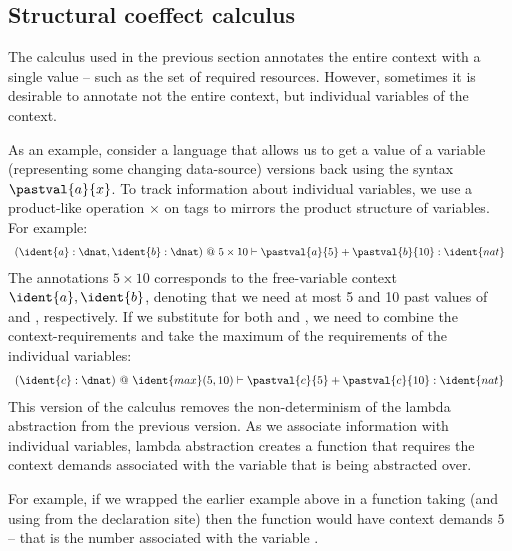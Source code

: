
\subsection{Structural coeffect calculus}

The calculus used in the previous section annotates the entire context with a single value --  such
as the set of required resources. However, sometimes it is desirable to annotate not the entire 
context, but individual variables of the context.

As an example, consider a language that allows us to get a value of a variable (representing
some changing data-source)  versions back using the syntax $\pastval{a}{x}$. 
To track information about individual variables, we use a product-like operation $\times$ on tags 
to mirrors the product structure of variables. For example:
%
\begin{equation*}
\begin{array}{l}
(\ident{a}:\dnat, \ident{b}:\dnat) ~@~ 5 \times 10
  \vdash
    \pastval{a}{5}+\pastval{b}{10}: \ident{nat}
\end{array}
\end{equation*}
%
The annotations $5 \times 10$ corresponds to the free-variable context $\ident{a}, \ident{b}$, denoting
that we need at most 5 and 10 past values of  and , respectively. If we substitute 
 for both  and , we need to combine the context-requirements and take the
maximum of the requirements of the individual variables:
%
\begin{equation*}
\begin{array}{l}
(\ident{c}:\dnat) ~@~ \ident{max}(5, 10)
  \vdash
    \pastval{c}{5}+\pastval{c}{10}: \ident{nat}
\end{array}
\end{equation*}
%
This version of the calculus removes the non-determinism of the lambda abstraction from the previous
version. As we associate information with individual variables, lambda abstraction creates a function
that requires the context demands associated with the variable that is being abstracted over.

For example, if we wrapped the earlier example above in a function taking  (and using 
 from the declaration site) then the function would have context demands $5$ -- that
is the number associated with the variable .

